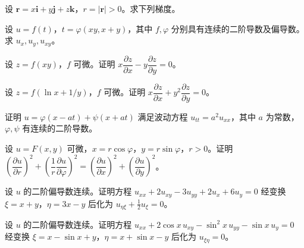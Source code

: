 \newpage
\noindent\begin{minipage}{\textwidth}
设 $\boldsymbol r=x\boldsymbol i+y\boldsymbol j+z\boldsymbol k$，$r=|\boldsymbol r|>0$。求下列梯度。
\end{minipage}\par\vfill
\noindent\begin{minipage}{\textwidth}
设 $u=f(t)$，$t=\varphi(xy,x+y)$，其中 $f,\varphi$ 分别具有连续的二阶导数及偏导数。求 $u_x,u_y,u_{xy}$。
\end{minipage}\par\vfill
\noindent\begin{minipage}{\textwidth}
设 $z=f(xy)$，$f$ 可微。证明 $x\dfrac{\partial z}{\partial x}-y\dfrac{\partial z}{\partial y}=0$。
\end{minipage}\par\vfill
\noindent\begin{minipage}{\textwidth}
设 $z=f(\ln x+1/y)$，$f$ 可微。证明 $x\dfrac{\partial z}{\partial x}+y^2\dfrac{\partial z}{\partial y}=0$。
\end{minipage}\par\vfill
\newpage
\noindent\begin{minipage}{\textwidth}
证明 $u=\varphi(x-at)+\psi(x+at)$ 满足波动方程 $u_{tt}=a^2u_{xx}$，其中 $a$ 为常数，$\varphi,\psi$ 有连续的二阶导数。
\end{minipage}\par\vfill
\noindent\begin{minipage}{\textwidth}
设 $u=F(x,y)$ 可微，$x=r\cos\varphi$，$y=r\sin\varphi$，$r>0$。证明 $\left(\dfrac{\partial u}{\partial r}\right)^2+\left(\dfrac1r\dfrac{\partial u}{\partial\varphi}\right)^2=\left(\dfrac{\partial u}{\partial x}\right)^2+\left(\dfrac{\partial u}{\partial y}\right)^2$。
\end{minipage}\par\vfill
\noindent\begin{minipage}{\textwidth}
设 $u$ 的二阶偏导数连续。证明方程 $u_{xx}+2u_{xy}-3u_{yy}+2u_x+6u_y=0$ 经变换 $\xi=x+y$，$\eta=3x-y$ 后化为 $u_{\eta\xi}+\tfrac12u_\xi=0$。
\end{minipage}\par\vfill
\noindent\begin{minipage}{\textwidth}
设 $u$ 的二阶偏导数连续。证明方程 $u_{xx}+2\cos x\,u_{xy}-\sin^2x\,u_{yy}-\sin x\,u_y=0$ 经变换 $\xi=x-\sin x+y$，$\eta=x+\sin x-y$ 后化为 $u_{\xi\eta}=0$。
\end{minipage}\par\vfill
